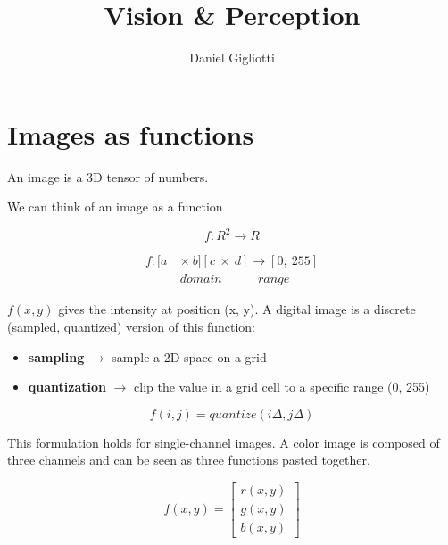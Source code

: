 \documentclass{article}
\title{\textbf{Vision \& Perception}}
\author{Daniel Gigliotti}
\date{}
\begin{document}
\maketitle

\section*{Images as functions}

An image is a 3D tensor of numbers. 

We can think of an image as a function 

\begin{equation*}
f:R^2 \rightarrow R
\end{equation*}

\begin{equation*}
    \begin{split}
    f: [a\ & \times \ b][c\ \times\ d] \rightarrow [0,\ 255] \\
    & domain\ \ \ \ \ \ \ \ \ \ \ \ \ range
    \end{split}
\end{equation*}

$f(x, y)$ gives the intensity at position (x, y). A digital image is a discrete (sampled, quantized) version of this function:

\begin{itemize}
    \item \textbf{sampling} $\rightarrow$ sample a 2D space on a grid
    \item \textbf{quantization} $\rightarrow$ clip the value in a grid cell to a specific range (0, 255)
\end{itemize}

\begin{equation*}
    f(i, j) = quantize(i\Delta, j\Delta)
\end{equation*}

This formulation holds for single-channel images. A color image is composed of three channels and can be seen as three functions pasted together.

\begin{equation*}
    f(x,y)= \begin{bmatrix}
        r(x,y) \\
       g(x,y) \\
       b(x,y)
    \end{bmatrix}
\end{equation*}

\newpage
\end{document}
